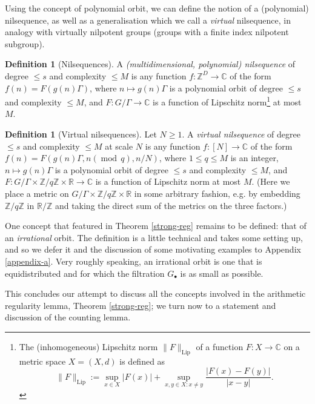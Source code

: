 \documentclass[11pt,reqno]{amsart}
\numberwithin{equation}{section}
\theoremstyle{plain}
\theoremstyle{definition}
\newtheorem{definition}[subsection]{Definition}
\renewcommand{\leq}{\leqslant}
\renewcommand{\geq}{\geqslant}
\newcommand{\md}[1]{\ensuremath{(\operatorname{mod}\, #1)}}
\newcommand\Z{\mathbb{Z}}
\newcommand\R{\mathbb{R}}
\newcommand\C{\mathbb{C}}
\newcommand\1{{\bf 1}}
\newcommand\2{{\bf 2}}
\begin{document}
Using the concept of polynomial orbit, we can define the notion of a (polynomial) nilsequence, as well as a generalisation which we call a \emph{virtual} nilsequence, in analogy with virtually nilpotent groups (groups with a finite index nilpotent subgroup).

\begin{definition}[Nilsequences]
A \emph{\textup{(}multidimensional, polynomial\textup{)} nilsequence} of degree $\leq s$ and complexity $\leq M$ is any function $f: \Z^D \to \C$ of the form $f(n) = F(g(n)\Gamma)$, where $n \mapsto g(n)\Gamma$ is a polynomial orbit of degree $\leq s$ and complexity $\leq M$, and $F: G/\Gamma \to \C$ is a function of Lipschitz norm\footnote{The (inhomogeneous) Lipschitz norm $\|F\|_{\operatorname{Lip}}$ of a function $F: X \to \C$ on a metric space $X = (X,d)$ is defined as
$$\|F\|_{\operatorname{Lip}} := \sup_{x \in X} |F(x)| + \sup_{x,y \in X: x \neq y} \frac{|F(x)-F(y)|}{|x-y|}.$$
} at most $M$.
\end{definition}

\begin{definition}[Virtual nilsequences]
Let $N \geq 1$.  A \emph{virtual nilsequence} of degree $\leq s$ and complexity $\leq M$ at scale $N$ is any function $f: [N] \to \C$ of the form $f(n) = F(g(n)\Gamma, n \md{q}, n/N)$, where $1 \leq q \leq M$ is an integer, $n \mapsto g(n)\Gamma$ is a polynomial orbit of degree $\leq s$ and complexity $\leq M$, and $F: G/\Gamma \times \Z/q\Z \times \R \to \C$ is a function of Lipschitz norm at most $M$.  (Here we place a metric on $G/\Gamma \times \Z/q\Z \times \R$ in some arbitrary fashion, e.g. by embedding $\Z/q\Z$ in $\R/\Z$ and taking the direct sum of the metrics on the three factors.)
\end{definition}


One concept that featured in Theorem \ref{strong-reg} remains to be defined: that of an \emph{irrational} orbit. The definition is a little technical and takes some setting up, and so we defer it and the discussion of some motivating examples to Appendix \ref{appendix-a}. Very roughly speaking, an irrational orbit is one that is equidistributed and for which the filtration $G_{\bullet}$ is as small as possible.  

This concludes our attempt to discuss all the concepts involved in the arithmetic regularity lemma, Theorem \ref{strong-reg}; we turn now to a statement and discussion of the counting lemma.\vspace{11pt}
\end{document}
